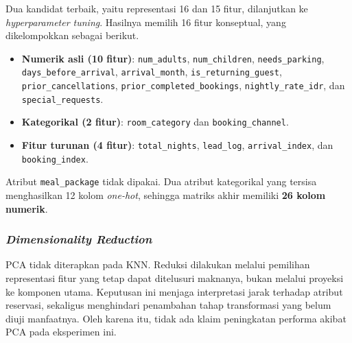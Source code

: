Dua kandidat terbaik, yaitu representasi 16 dan 15 fitur, dilanjutkan ke \textit{hyperparameter tuning}. Hasilnya memilih 16 fitur konseptual, yang dikelompokkan sebagai berikut.
\begin{itemize}
 \small\sloppy
 \item \textbf{Numerik asli (10 fitur)}: \nolinkurl{num_adults}, \nolinkurl{num_children}, \nolinkurl{needs_parking}, \nolinkurl{days_before_arrival}, \nolinkurl{arrival_month}, \nolinkurl{is_returning_guest}, \nolinkurl{prior_cancellations}, \nolinkurl{prior_completed_bookings}, \nolinkurl{nightly_rate_idr}, dan \nolinkurl{special_requests}.
 \item \textbf{Kategorikal (2 fitur)}: \nolinkurl{room_category} dan \nolinkurl{booking_channel}.
 \item \textbf{Fitur turunan (4 fitur)}: \nolinkurl{total_nights}, \nolinkurl{lead_log}, \nolinkurl{arrival_index}, dan \nolinkurl{booking_index}.
\end{itemize}
Atribut \texttt{meal\_package} tidak dipakai. Dua atribut kategorikal yang tersisa menghasilkan 12 kolom \textit{one-hot}, sehingga matriks akhir memiliki \textbf{26 kolom numerik}.

\subsubsection{\textit{Dimensionality Reduction}}
PCA tidak diterapkan pada KNN. Reduksi dilakukan melalui pemilihan representasi fitur yang tetap dapat ditelusuri maknanya, bukan melalui proyeksi ke komponen utama. Keputusan ini menjaga interpretasi jarak terhadap atribut reservasi, sekaligus menghindari penambahan tahap transformasi yang belum diuji manfaatnya. Oleh karena itu, tidak ada klaim peningkatan performa akibat PCA pada eksperimen ini.